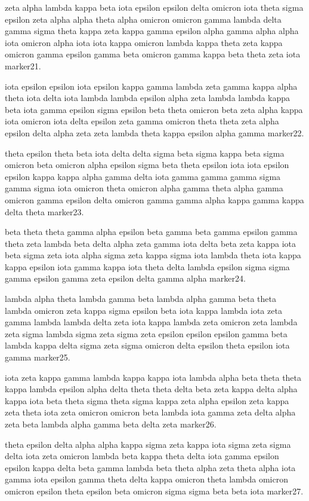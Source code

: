 \documentclass{article}
\begin{document}
zeta alpha lambda kappa beta iota epsilon epsilon delta omicron iota theta sigma epsilon zeta alpha alpha theta alpha omicron omicron gamma lambda delta gamma sigma theta kappa zeta kappa gamma epsilon alpha gamma alpha alpha iota omicron alpha iota iota kappa omicron lambda kappa theta zeta kappa omicron gamma epsilon gamma beta omicron gamma kappa beta theta zeta iota marker21.

iota epsilon epsilon iota epsilon kappa gamma lambda zeta gamma kappa alpha theta iota delta iota lambda lambda epsilon alpha zeta lambda lambda kappa beta iota gamma epsilon sigma epsilon beta theta omicron beta zeta alpha kappa iota omicron iota delta epsilon zeta gamma omicron theta theta zeta alpha epsilon delta alpha zeta zeta lambda theta kappa epsilon alpha gamma marker22.

theta epsilon theta beta iota delta delta sigma beta sigma kappa beta sigma omicron beta omicron alpha epsilon sigma beta theta epsilon iota iota epsilon epsilon kappa kappa alpha gamma delta iota gamma gamma gamma sigma gamma sigma iota omicron theta omicron alpha gamma theta alpha gamma omicron gamma epsilon delta omicron gamma gamma alpha kappa gamma kappa delta theta marker23.

beta theta theta gamma alpha epsilon beta gamma beta gamma epsilon gamma theta zeta lambda beta delta alpha zeta gamma iota delta beta zeta kappa iota beta sigma zeta iota alpha sigma zeta kappa sigma iota lambda theta iota kappa kappa epsilon iota gamma kappa iota theta delta lambda epsilon sigma sigma gamma epsilon gamma zeta epsilon delta gamma alpha marker24.

lambda alpha theta lambda gamma beta lambda alpha gamma beta theta lambda omicron zeta kappa sigma epsilon beta iota kappa lambda iota zeta gamma lambda lambda delta zeta iota kappa lambda zeta omicron zeta lambda zeta sigma lambda sigma zeta sigma zeta epsilon epsilon epsilon gamma beta lambda kappa delta sigma zeta sigma omicron delta epsilon theta epsilon iota gamma marker25.

iota zeta kappa gamma lambda kappa kappa iota lambda alpha beta theta theta kappa lambda epsilon alpha delta theta theta delta beta zeta kappa delta alpha kappa iota beta theta sigma theta sigma kappa zeta alpha epsilon zeta kappa zeta theta iota zeta omicron omicron beta lambda iota gamma zeta delta alpha zeta beta lambda alpha gamma beta delta zeta marker26.

theta epsilon delta alpha alpha kappa sigma zeta kappa iota sigma zeta sigma delta iota zeta omicron lambda beta kappa theta delta iota gamma epsilon epsilon kappa delta beta gamma lambda beta theta alpha zeta theta alpha iota gamma iota epsilon gamma theta delta kappa omicron theta lambda omicron omicron epsilon theta epsilon beta omicron sigma sigma beta beta iota marker27.
\end{document}
